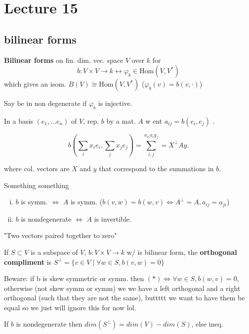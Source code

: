 \documentclass{report}
\begin{document}

\section{Lecture 15}

%

\subsection{bilinear forms}

\textbf{Bilinear forms} on fin. dim. vec. space \( V \) over \( k \) for
\[ b: V \times  V \to k \longleftrightarrow  \varphi _b \in  \text{Hom}(V,V^*)\]
which gives an isom. \( B(V) \cong \text{Hom}(V,V^*) \) (\( \varphi  _b (v)=b(v,\cdot) \))

Say be in non degenerate if \( \varphi_b  \) is injective. 

In a basis \( (e_{1},\ldots e_n) \) of \( V \), rep. \( b \) by a mat. \( A \) w ent \( a_{ij}=b(e_i,e_j) \) .

\[
  b(\sum_i x_ie_i,\sum_jx_je_j) = \displaystyle\sum_{i,j}^{ a_{ij}x_iy_j}=X^{\perp}Ay
.\] 

where col. vectors are \( X \) and \( y \) that correspond to the summations in \( b \). 


Something something
\begin{enumerate}[i.]
  \item \( b \) is symm. \( \iff \) \( A \) is symm. (\( b(v,w)=b(w,v) \iff A^{\perp}=A, a_{ij}=a_{ji} \))
  \item \( b \) is nondegenerate \( \iff \) \( A \) is invertible. 
\end{enumerate}


 "Two vectors paired together to zero"

\begin{definition}[Orthogonality]
  If \( S \subset V \) is a subspace of \( V \), \( b:V\times V \to k \) w/ is bilinear form, the \textbf{orthogonal compliment} is \( S^{\perp}=\{v \in  V \mid  \forall w \in  S, b(v,w)=0 \} \)
\end{definition}

Beware: if b is skew symmetric or symm. then \( (*)\iff \forall w \in  S, b(w,v)=0 \), otherwise (not skew symm or symm) we we have a left orthogonal and a right orthogonal (such that they are not the same), buttttt we want to have them be equal so we just will ignore this for now lol. 

\begin{lemma}
  If \( b \) is nondegenerate then \( dim(S^{\perp})=dim(V)-dim(S) \), else ineq. 
\end{lemma}
\end{document}
